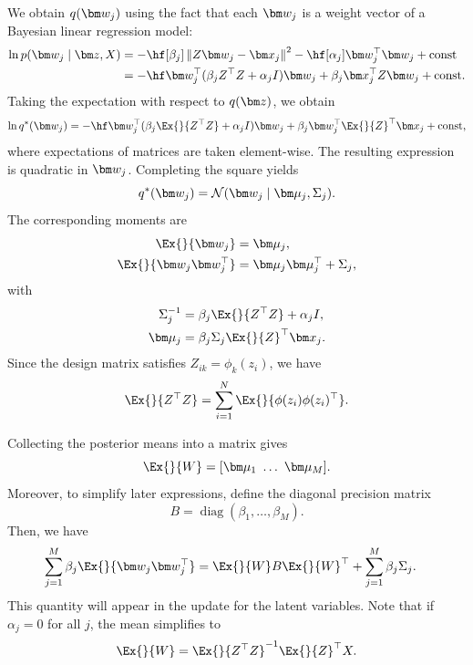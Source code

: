 We obtain $q(\vect{w}_j)$ using the fact that each $\vect{w}_j$ is a weight vector of a Bayesian linear regression
model:
\begin{align*}
    \ln p(\vect{w}_j \mid \vect{z}, X) &= -\hf[\beta_j] \normsq{Z\vect{w}_j - \vect{x}_j} -
    \hf[\alpha_j] \trans{\vect{w}_j} \vect{w}_j + \text{const} \\
    &= -\hf \trans{\vect{w}_j} (\beta_j \trans{Z}Z + \alpha_j I) \vect{w}_j +
    \beta_j \trans{\vect{x}_j} Z \vect{w}_j + \text{const}.
\end{align*}
Taking the expectation with respect to $q(\vect{z})$, we obtain
\begin{equation*}
    \ln q^*(\vect{w}_j) = -\hf \trans{\vect{w}_j} (\beta_j \Ex{}{\trans{Z}Z} + \alpha_j I)
    \vect{w}_j +
    \beta_j \trans{\vect{w}_j} \trans{\Ex{}{Z}} \vect{x}_j + \text{const},
\end{equation*}
where expectations of matrices are taken element-wise.
The resulting expression is quadratic in $\vect{w}_j$.
Completing the square yields
\begin{equation*}
    q^*(\vect{w}_j) = \mathcal{N}(\vect{w}_j \mid \vect{\mu}_j, \Sigma_j).
\end{equation*}
The corresponding moments are
\begin{align*}
    \Ex{}{\vect{w}_j} &= \vect{\mu}_j, \\
    \Ex{}{\vect{w}_j \trans{\vect{w}_j}} &= \vect{\mu}_j \trans{\vect{\mu}_j} + \Sigma_j,
\end{align*}
with
\begin{align*}
    \Sigma_j^{-1} &= \beta_j \Ex{}{\trans{Z}Z} + \alpha_j I, \\
    \vect{\mu}_j &= \beta_j \Sigma_j \trans{\Ex{}{Z}} \vect{x}_j.
\end{align*}
Since the design matrix satisfies $Z_{ik} = \phi_k(z_i)$, we have
\[
    \Ex{}{\trans{Z}Z} = \sum_{i=1}^{N} \Ex{}{\phi(z_i) \trans{\phi(z_i)}}.
\]

Collecting the posterior means into a matrix gives
\[
    \Ex{}{W} = [ \vect{\mu}_1 \ \dots \ \vect{\mu}_M ].
\]
Moreover, to simplify later expressions, define the diagonal precision matrix
\[
    B = \operatorname{diag}(\beta_1, \dots, \beta_M).
\]
Then, we have
\begin{align*}
    \sum_{j=1}^M \beta_j \Ex{}{\vect{w}_j \trans{\vect{w}_j}} &=
    \Ex{}{W} B \trans{\Ex{}{W}} + \sum_{j=1}^M \beta_j \Sigma_j.
\end{align*}
This quantity will appear in the update for the latent variables.
Note that if $\alpha_j = 0$ for all $j$, the mean simplifies to
\[
    \Ex{}{W} =  \Ex{}{\trans{Z}Z}^{-1} \trans{\Ex{}{Z}} X.
\]

